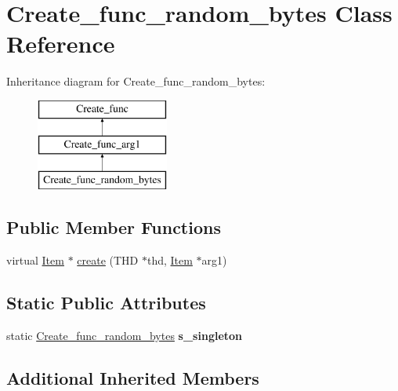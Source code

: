 \hypertarget{classCreate__func__random__bytes}{}\section{Create\+\_\+func\+\_\+random\+\_\+bytes Class Reference}
\label{classCreate__func__random__bytes}
Inheritance diagram for Create\+\_\+func\+\_\+random\+\_\+bytes\+:\begin{figure}[H]
\begin{center}
\leavevmode
\includegraphics[height=3.000000cm]{classCreate__func__random__bytes}
\end{center}
\end{figure}
\subsection*{Public Member Functions}
\begin{DoxyCompactItemize}
\item 
virtual \mbox{\hyperlink{classItem}{Item}} $\ast$ \mbox{\hyperlink{classCreate__func__random__bytes_a54d9295e4ce75cb3cb0a9fb9a2d2f359}{create}} (T\+HD $\ast$thd, \mbox{\hyperlink{classItem}{Item}} $\ast$arg1)
\end{DoxyCompactItemize}
\subsection*{Static Public Attributes}
\begin{DoxyCompactItemize}
\item 
\mbox{\label{classCreate__func__random__bytes_ad9a1b44b1d26319893120e7bda550477}} 
static \mbox{\hyperlink{classCreate__func__random__bytes}{Create\+\_\+func\+\_\+random\+\_\+bytes}} {\bfseries s\+\_\+singleton}
\end{DoxyCompactItemize}
\subsection*{Additional Inherited Members}


